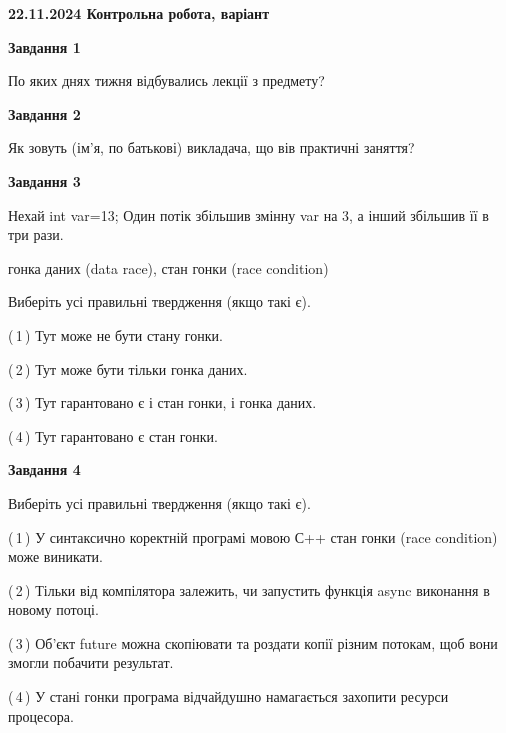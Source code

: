 \documentclass[12pt, ukrainian]{article}
\begin{document}
\begin {large}

\textbf{22.11.2024 Контрольна робота, варіант  }\par


{

\begin{center}
\textbf{Завдання 1}
\end{center}

По яких днях тижня відбувались лекції з предмету?


\begin{center}
\textbf{Завдання 2}
\end{center}

Як зовуть (ім'я, по батькові) викладача, що вів практичні заняття?


\begin{center}
\textbf{Завдання 3}
\end{center}

Нехай int var=13; Один потік збільшив змінну var на 3, а інший збільшив її в три рази.

гонка даних (data race), стан гонки (race condition)

Виберіть усі правильні твердження (якщо такі є).\par
\vspace{2mm}
(\,1\,) Тут може не бути стану гонки.%

(\,2\,) Тут може бути тільки гонка даних.%

(\,3\,) Тут гарантовано є і стан гонки, і гонка даних.%

(\,4\,) Тут гарантовано є стан гонки.%


\begin{center}
\textbf{Завдання 4}
\end{center}

Виберіть усі правильні твердження (якщо такі є).\par
\vspace{2mm}

(\,1\,) У синтаксично коректній програмі мовою С++ стан гонки (race condition) може виникати.%

(\,2\,) Тільки від компілятора залежить, чи запустить функція async виконання в новому потоці.%

(\,3\,) Об’єкт future можна скопіювати та роздати копії різним потокам, щоб вони змогли побачити результат.%

(\,4\,) У стані гонки програма відчайдушно намагається захопити ресурси процесора.%


}
\end{large}
\end{document}
